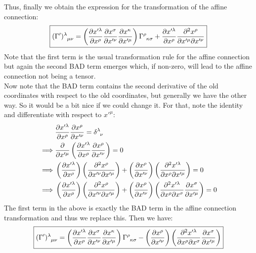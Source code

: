 Thus, finally we obtain the expression for the transformation of the affine connection:
$$\boxed{ \tensor{(\Gamma')}{^\lambda _\mu _\nu} = \brac{\pdv{x'^\lambda}{x^\rho}\pdv{x^\sigma}{x'^\nu} \pdv{x^\kappa}{x'^\mu}}  \tensor{\Gamma}{^\rho _\kappa _\sigma} +\pdv{x'^\lambda}{x^\rho}\pdv{x^\rho}{x'^\mu}{x'^\nu} }$$
Note that the first term is the usual transformation rule for the affine connection but again the second BAD term emerges which, if non-zero, will lead to the affine connection not being a tensor.\\[0.3cm]
Now note that the BAD term contains the second derivative of the old coordinates with respect to the old coordinates, but generally we have the other way. So it would be a bit nice if we could change it. For that, note the identity and differentiate with respect to $x'^\mu$:
\begin{align*}
   &\pdv{x'^\lambda}{x^\rho}\pdv{x^\rho}{x'^\nu}=\tensor{\delta}{^\lambda_\nu}\\
\implies & \pdv{x'^\mu}\brac{\pdv{x'^\lambda}{x^\rho}\pdv{x^\rho}{x'^\nu}}=0\\
\implies & \brac{\pdv{x'^\lambda}{x^\rho}} \brac{\pdv{x^\rho}{x'^\nu}{x'^\mu} }+ \brac{\pdv{x^\rho}{x'^\nu}}\brac{\pdv{x'^\lambda}{x^\rho}{x'^\mu}}=0\\
\implies & \brac{\pdv{x'^\lambda}{x^\rho}} \brac{\pdv{x^\rho}{x'^\nu}{x'^\mu} } + \brac{\pdv{x^\rho}{x'^\nu}}\brac{\pdv{x'^\lambda}{x^\rho}{x^\sigma}\pdv{x^\sigma}{x'^\mu}}=0
\end{align*}
The first term in the above is exactly the BAD term in the affine connection transformation and thus we replace this. Then we have: 
$$\boxed{ \tensor{(\Gamma')}{^\lambda _\mu _\nu} = \brac{\pdv{x'^\lambda}{x^\rho}\pdv{x^\sigma}{x'^\nu} \pdv{x^\kappa}{x'^\mu}}  \tensor{\Gamma}{^\rho _\kappa _\sigma} - \brac{\pdv{x^\rho}{x'^\nu}}\brac{\pdv{x'^\lambda}{x^\rho}{x^\sigma}\pdv{x^\sigma}{x'^\mu}} }$$
